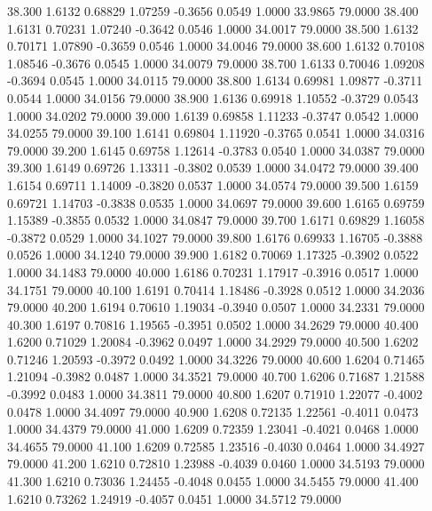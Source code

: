   38.300   1.6132   0.68829   1.07259  -0.3656   0.0549   1.0000  33.9865  79.0000
  38.400   1.6131   0.70231   1.07240  -0.3642   0.0546   1.0000  34.0017  79.0000
  38.500   1.6132   0.70171   1.07890  -0.3659   0.0546   1.0000  34.0046  79.0000
  38.600   1.6132   0.70108   1.08546  -0.3676   0.0545   1.0000  34.0079  79.0000
  38.700   1.6133   0.70046   1.09208  -0.3694   0.0545   1.0000  34.0115  79.0000
  38.800   1.6134   0.69981   1.09877  -0.3711   0.0544   1.0000  34.0156  79.0000
  38.900   1.6136   0.69918   1.10552  -0.3729   0.0543   1.0000  34.0202  79.0000
  39.000   1.6139   0.69858   1.11233  -0.3747   0.0542   1.0000  34.0255  79.0000
  39.100   1.6141   0.69804   1.11920  -0.3765   0.0541   1.0000  34.0316  79.0000
  39.200   1.6145   0.69758   1.12614  -0.3783   0.0540   1.0000  34.0387  79.0000
  39.300   1.6149   0.69726   1.13311  -0.3802   0.0539   1.0000  34.0472  79.0000
  39.400   1.6154   0.69711   1.14009  -0.3820   0.0537   1.0000  34.0574  79.0000
  39.500   1.6159   0.69721   1.14703  -0.3838   0.0535   1.0000  34.0697  79.0000
  39.600   1.6165   0.69759   1.15389  -0.3855   0.0532   1.0000  34.0847  79.0000
  39.700   1.6171   0.69829   1.16058  -0.3872   0.0529   1.0000  34.1027  79.0000
  39.800   1.6176   0.69933   1.16705  -0.3888   0.0526   1.0000  34.1240  79.0000
  39.900   1.6182   0.70069   1.17325  -0.3902   0.0522   1.0000  34.1483  79.0000
  40.000   1.6186   0.70231   1.17917  -0.3916   0.0517   1.0000  34.1751  79.0000
  40.100   1.6191   0.70414   1.18486  -0.3928   0.0512   1.0000  34.2036  79.0000
  40.200   1.6194   0.70610   1.19034  -0.3940   0.0507   1.0000  34.2331  79.0000
  40.300   1.6197   0.70816   1.19565  -0.3951   0.0502   1.0000  34.2629  79.0000
  40.400   1.6200   0.71029   1.20084  -0.3962   0.0497   1.0000  34.2929  79.0000
  40.500   1.6202   0.71246   1.20593  -0.3972   0.0492   1.0000  34.3226  79.0000
  40.600   1.6204   0.71465   1.21094  -0.3982   0.0487   1.0000  34.3521  79.0000
  40.700   1.6206   0.71687   1.21588  -0.3992   0.0483   1.0000  34.3811  79.0000
  40.800   1.6207   0.71910   1.22077  -0.4002   0.0478   1.0000  34.4097  79.0000
  40.900   1.6208   0.72135   1.22561  -0.4011   0.0473   1.0000  34.4379  79.0000
  41.000   1.6209   0.72359   1.23041  -0.4021   0.0468   1.0000  34.4655  79.0000
  41.100   1.6209   0.72585   1.23516  -0.4030   0.0464   1.0000  34.4927  79.0000
  41.200   1.6210   0.72810   1.23988  -0.4039   0.0460   1.0000  34.5193  79.0000
  41.300   1.6210   0.73036   1.24455  -0.4048   0.0455   1.0000  34.5455  79.0000
  41.400   1.6210   0.73262   1.24919  -0.4057   0.0451   1.0000  34.5712  79.0000
